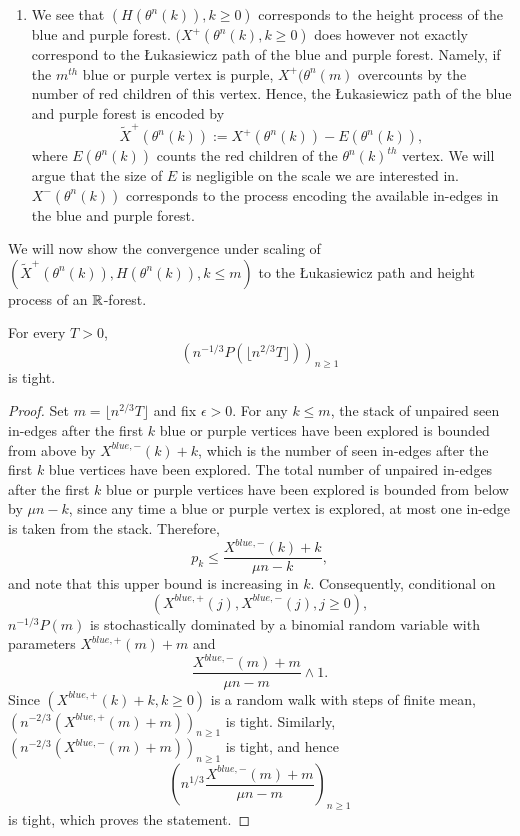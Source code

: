 \begin{enumerate}
\item We see that $(H(\theta^{n}(k)),k\geq 0)$ corresponds to the height process of the blue and purple forest. $(X^+(\theta^{n}(k),k\geq 0)$ does however not exactly correspond to the \L ukasiewicz path of the blue and purple forest. Namely, if the $m^{th}$ blue or purple vertex is purple, $X^+(\theta^{n}(m)$ overcounts by the number of red children of this vertex. Hence, the \L ukasiewicz path of the blue and purple forest is encoded by \begin{equation}\label{eq.definitiontildeX}\tilde{X}^+(\theta^{n}(k)):=X^+(\theta^{n}(k))-E(\theta^{n}(k)),\end{equation}
where 
$E(\theta^{n}(k))$ counts the red children of the $\theta^n(k)^{th}$ vertex. We will argue that the size of $E$ is negligible on the scale we are interested in. $X^-(\theta^{n}(k))$ corresponds to the process encoding the available in-edges in the blue and purple forest.
\end{enumerate} 
We will now show the convergence under scaling of $(\tilde{X}^+(\theta^{n}(k)),H(\theta^{n}(k)),k\leq m)$ to the \L ukasiewicz path and height process of an ${\mathbb R}$-forest. 
 \begin{lemma}\label{lemma.tightnesssurplus edges}
 For every $T>0$, $$\left(n^{-1/3}P\left(\lfloor  n^{2/3}T\rfloor \right) \right)_{n\geq 1}$$ 
 is tight.
 \end{lemma}
 \begin{proof}
Set $m=\lfloor  n^{2/3}T\rfloor$ and fix $\epsilon>0$. For any $k\leq m$, the stack of unpaired seen in-edges after the first $k$ blue or purple vertices have been explored is bounded from above by $X^{blue,-}(k)+k$, which is the number of seen in-edges after the first $k$ blue vertices have been explored. The total number of unpaired in-edges after the first $k$ blue or purple vertices have been explored is bounded from below by $\mu n - k$, since any time a blue or purple vertex is explored, at most one in-edge is taken from the stack. Therefore, $$p_k\leq \frac{X^{blue,-}(k)+k}{\mu n - k},$$
and note that this upper bound is increasing in $k$. Consequently, conditional on $$(X^{blue,+}(j),X^{blue,-}(j),j\geq 0),$$ $n^{-1/3}P(m)$ is stochastically dominated by a binomial random variable with parameters  $X^{blue,+}(m)+m$ and $$\frac{X^{blue,-}(m)+m}{\mu n - m}\wedge 1.$$
Since $(X^{blue,+}(k)+k,k\geq 0)$ is a random walk with steps of finite mean, $\left(n^{-2/3}(X^{blue,+}(m)+m)\right)_{n\geq 1}$ is tight. Similarly, $\left(n^{-2/3}(X^{blue,-}(m)+m)\right)_{n\geq 1}$ is tight, and hence 
$$\left(n^{1/3} \frac{X^{blue,-}(m)+m}{\mu n - m}\right)_{n\geq 1}$$ is tight, which proves the statement.
\end{proof}\\

